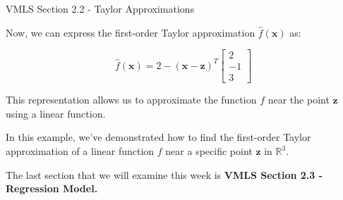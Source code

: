 \begin{notes}{VMLS Section 2.2 - Taylor Approximations}
\begin{highlight}
        Now, we can express the first-order Taylor approximation \(\hat{f}(\mathbf{x})\) as:
        
        \[\hat{f}(\mathbf{x}) = 2 - (\mathbf{x} - \mathbf{z})^T \begin{bmatrix} 2 \\ -1 \\ 3 \end{bmatrix}\]
        
        This representation allows us to approximate the function \(f\) near the point \(\mathbf{z}\) using a linear function.

        
        In this example, we've demonstrated how to find the first-order Taylor approximation of a linear function \(f\) near a specific point \(\mathbf{z}\) in \(\mathbb{R}^3\).
    \end{highlight}
\end{notes}

The last section that we will examine this week is \textbf{VMLS Section 2.3 - Regression Model.}

